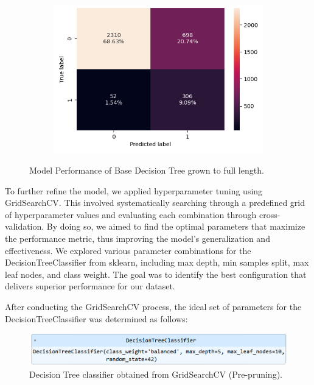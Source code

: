\documentclass[12pt,a4paper]{article}
\begin{document}
\begin{figure}[h]
\begin{subfigure}[t]{0.45\textwidth}
			\includegraphics[width=\textwidth]{dTree_c_Matrix_test.png}
			\caption{}
			\label{fig:dTree_base_c_Matrix_test}
		\end{subfigure}
		\caption{Model Performance of Base Decision Tree grown to full length.}
		\label{fig:Model Performance of Base Decision Tree}
	\end{figure}
	
	To further refine the model, we applied hyperparameter tuning using GridSearchCV. This involved systematically searching through a predefined grid of hyperparameter values and evaluating each combination through cross-validation. By doing so, we aimed to find the optimal parameters that maximize the performance metric, thus improving the model’s generalization and effectiveness. We explored various parameter combinations for the DecisionTreeClassifier from sklearn, including max depth, min samples split, max leaf nodes, and class weight. The goal was to identify the best configuration that delivers superior performance for our dataset.
	
	After conducting the GridSearchCV process, the ideal set of parameters for the DecisionTreeClassifier was determined as follows:
	\begin{figure}[h]
		\centering
		\includegraphics[width=0.8\linewidth]{Tuned_dtree_classifier}
		\caption{Decision Tree classifier obtained from GridSearchCV (Pre-pruning).}
		\label{fig:Tuned_dtree_classifiers}
	\end{figure}
	
\end{document}
